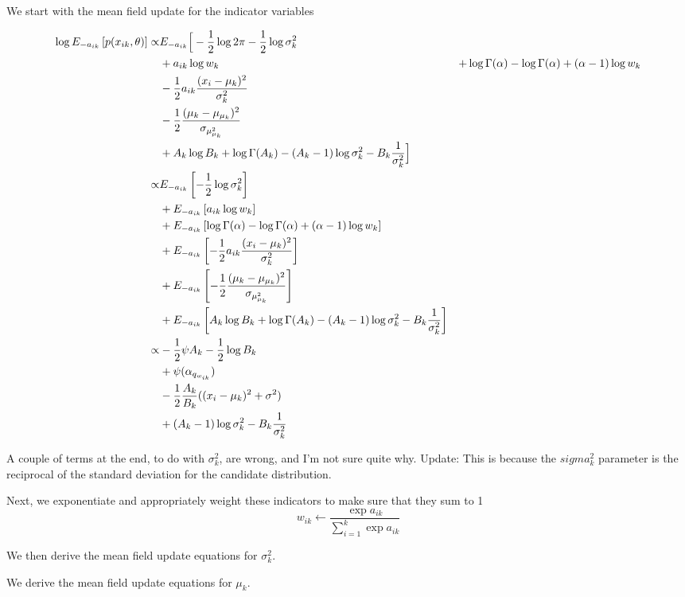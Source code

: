 \documentclass{amsart}
\begin{document}
We start with the mean field update for the indicator variables

\begin{align*}
\log{E_{-a_{ik}} \left[ p(x_{ik}, \theta) \right] } 
    \propto 
& E_{-a_{ik}} 
\Big[  
- \frac{1}{2} \log{2 \pi} 
- \frac{1}{2} \log{\sigma_k^2} 
\\
& + a_{ik} \log{w_k} 
& + \log \Gamma(\alpha) 
  - \log{\Gamma(\alpha)} 
  + (\alpha - 1)\log{w_k}\\
& - \frac{1}{2} a_{ik}\frac{(x_i - \mu_k)^2}{\sigma_k^2}\\
& - \frac{1}{2} \frac{(\mu_k - \mu_{\mu_k})^2}{\sigma_{\mu_{\mu_k}^2}} 
\\
& 
+ A_k \log{B_k} 
+ \log{\Gamma(A_k)} 
- (A_k - 1) \log{\sigma_k^2} 
- B_k \frac{1}{\sigma_k^2} \Big] 
\\
\propto&E_{-a_{ik}} \left[  
- \frac{1}{2} \log{\sigma_k^2} 
\right] 
\\
& + E_{-a_{ik}}\left[ a_{ik} \log{w_k} \right]
\\
& + E_{-a_{ik}}\left[ \log \Gamma(\alpha) - \log{\Gamma(\alpha)} + (\alpha - 1) \log{w_k} \right]
\\
& + E_{-a_{ik}}\left[- \frac{1}{2} a_{ik} \frac{(x_i - \mu_k)^2}{\sigma_k^2} \right]
\\
& + E_{-a_{ik}}\left[- \frac{1}{2} \frac{(\mu_k - \mu_{\mu_k})^2}{\sigma_{\mu_{\mu_k}^2}} \right] 
\\
&+ E_{-a_{ik}}\left[A_k \log{B_k} + \log{\Gamma(A_k)} - (A_k - 1) \log{\sigma_k^2} - B_k \frac{1}{\sigma_k^2} \right] \\
\propto
& - \frac{1}{2} \psi{A_k} - \frac{1}{2} \log{B_k} 
\\
& + \psi{(\alpha_{q_{w_{ik}}})}
\\
& - \frac{1}{2} \frac{A_k}{B_k} ((x_i - \mu_k)^2 + \sigma^2)
\\
& + (A_k - 1) \log{\sigma_k^2} - B_k \frac{1}{\sigma_k^2}
\end{align*}

A couple of terms at the end, to do with $\sigma_k^2$, are wrong, and I'm not sure quite why.
Update: This is because the $sigma_k^2$ parameter is the reciprocal of the standard deviation
for the candidate distribution.

Next, we exponentiate and appropriately weight these indicators to make sure that they
sum to 1
\[
w_{ik} \leftarrow \frac{\exp{a_{ik}}}{\sum_{i=1}^k \exp{a_{ik}}}
\]

We then derive the mean field update equations for $\sigma_k^2$.

We derive the mean field update equations for $\mu_k$.
\end{document}
